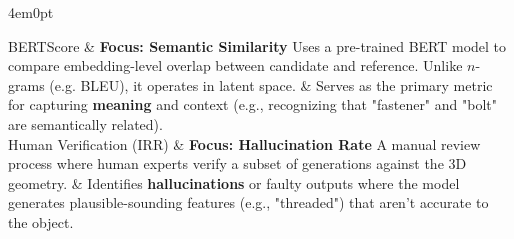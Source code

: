 \begin{indentedblock}{4em}{0pt}
\begin{table}[H]
\begin{tblr}
						BERTScore \parencite{bertscore_zhang}
						& \textbf{Focus: Semantic Similarity} \newline
						Uses a pre-trained BERT model to compare embedding-level overlap between candidate and reference. Unlike $n$-grams (e.g. BLEU), it operates in latent space.
						& Serves as the primary metric for capturing \textbf{meaning} and context (e.g., recognizing that "fastener" and "bolt" are semantically related). \\
						
						Human Verification (IRR)
						& \textbf{Focus: Hallucination Rate} \newline
						A manual review process where human experts verify a subset of generations against the 3D geometry.
						& Identifies \textbf{hallucinations} or faulty outputs where the model generates plausible-sounding features (e.g., "threaded") that aren't accurate to the object. \\
						
					\end{tblr}
					\label{tab:evaluation-metrics}
				\end{table}
				
			\end{indentedblock}
